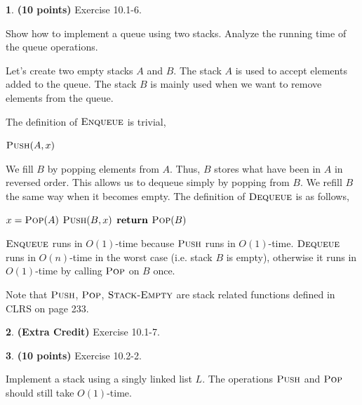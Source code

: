 \documentclass[11pt]{article}
\theoremstyle{definition}
\theoremstyle{theorem}
\newtheorem{prob}{}
\newcommand{\solution}{\medskip\noindent{\color{DarkBlue}\textbf{Solution:}}}
\begin{document}
\newpage
\begin{prob} \textbf{(10 points)} Exercise 10.1-6.
\end{prob}
Show how to implement a queue using two stacks. Analyze the running time of the queue operations.

\solution

Let's create two empty stacks $A$ and $B$. The stack $A$ is used to accept elements added to the queue. The stack $B$ is mainly used when we want to remove elements from the queue.

The definition of $\textproc{\textsc{Enqueue}}$ is trivial,

\begin{algorithmic}[1]
	\State $\textproc{\textsc{Push}}(A, x)$ 
\EndFunction
\end{algorithmic}

We fill $B$ by popping elements from $A$. Thus, $B$ stores what have been in $A$ in reversed order. This allows us to dequeue simply by popping from $B$. We refill $B$ the same way when it becomes empty. The definition of $\textproc{\textsc{Dequeue}}$ is as follows,

\begin{algorithmic}[1]
			\State $x = \textproc{\textsc{Pop}}(A)$
			\State $\textproc{\textsc{Push}}(B, x)$
		\EndWhile
	\EndIf
	\State $\textbf{return } \textproc{\textsc{Pop}}(B)$
\EndFunction
\end{algorithmic}

$\textproc{\textsc{Enqueue}}$ runs in $O(1)$-time because $\textproc{\textsc{Push}}$ runs in $O(1)$-time. $\textproc{\textsc{Dequeue}}$ runs in $O(n)$-time in the worst case (i.e. stack $B$ is empty), otherwise it runs in $O(1)$-time by calling $\textproc{\textsc{Pop}}$ on $B$ once.

Note that $\textproc{\textsc{Push}}$, $\textproc{\textsc{Pop}}$, $\textproc{\textsc{Stack-Empty}}$ are stack related functions defined in CLRS on page 233.


\newpage
\begin{prob} \textbf{(Extra Credit)} Exercise 10.1-7.
\end{prob}

\newpage
\begin{prob} \textbf{(10 points)} Exercise 10.2-2.
\end{prob}
Implement a stack using a singly linked list $L$. The operations $\textproc{\textsc{Push}}$ and $\textproc{\textsc{Pop}}$ should still take $O(1)$-time.
\end{document}
